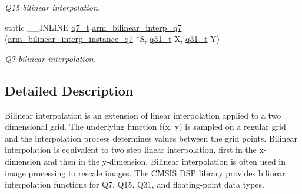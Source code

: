 \begin{DoxyCompactItemize}
\begin{DoxyCompactList}\small\item\em Q15 bilinear interpolation. \end{DoxyCompactList}\item 
static \+\_\+\+\_\+\+I\+N\+L\+I\+NE \hyperlink{arm__math_8h_ae541b6f232c305361e9b416fc9eed263}{q7\+\_\+t} \hyperlink{group___bilinear_interpolate_gade8db9706a3ae9ad03b2750a239d2ee6}{arm\+\_\+bilinear\+\_\+interp\+\_\+q7} (\hyperlink{structarm__bilinear__interp__instance__q7}{arm\+\_\+bilinear\+\_\+interp\+\_\+instance\+\_\+q7} $\ast$S, \hyperlink{arm__math_8h_adc89a3547f5324b7b3b95adec3806bc0}{q31\+\_\+t} X, \hyperlink{arm__math_8h_adc89a3547f5324b7b3b95adec3806bc0}{q31\+\_\+t} Y)
\begin{DoxyCompactList}\small\item\em Q7 bilinear interpolation. \end{DoxyCompactList}\end{DoxyCompactItemize}


\subsection{Detailed Description}
Bilinear interpolation is an extension of linear interpolation applied to a two dimensional grid. The underlying function {\ttfamily f(x, y)} is sampled on a regular grid and the interpolation process determines values between the grid points. Bilinear interpolation is equivalent to two step linear interpolation, first in the x-\/dimension and then in the y-\/dimension. Bilinear interpolation is often used in image processing to rescale images. The C\+M\+S\+IS D\+SP library provides bilinear interpolation functions for Q7, Q15, Q31, and floating-\/point data types.

